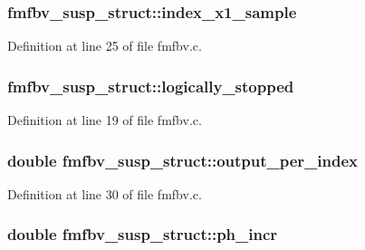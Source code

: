 \subsubsection[{\texorpdfstring{index\+\_\+x1\+\_\+sample}{index_x1_sample}}]{ fmfbv\+\_\+susp\+\_\+struct\+::index\+\_\+x1\+\_\+sample}\hypertarget{structfmfbv__susp__struct_a6970c3b7b1824fd09514ded85c92fd02}{}\label{structfmfbv__susp__struct_a6970c3b7b1824fd09514ded85c92fd02}


Definition at line 25 of file fmfbv.\+c.

\subsubsection[{\texorpdfstring{logically\+\_\+stopped}{logically_stopped}}]{ fmfbv\+\_\+susp\+\_\+struct\+::logically\+\_\+stopped}\hypertarget{structfmfbv__susp__struct_a9307bf1cf670bf7fa11a7f42f674cdbf}{}\label{structfmfbv__susp__struct_a9307bf1cf670bf7fa11a7f42f674cdbf}


Definition at line 19 of file fmfbv.\+c.

\subsubsection[{\texorpdfstring{output\+\_\+per\+\_\+index}{output_per_index}}]{\setlength{\rightskip}{0pt plus 5cm}double fmfbv\+\_\+susp\+\_\+struct\+::output\+\_\+per\+\_\+index}\hypertarget{structfmfbv__susp__struct_a3798c00c3248a599b9cf341f925e6239}{}\label{structfmfbv__susp__struct_a3798c00c3248a599b9cf341f925e6239}


Definition at line 30 of file fmfbv.\+c.

\subsubsection[{\texorpdfstring{ph\+\_\+incr}{ph_incr}}]{\setlength{\rightskip}{0pt plus 5cm}double fmfbv\+\_\+susp\+\_\+struct\+::ph\+\_\+incr}\hypertarget{structfmfbv__susp__struct_ad8731c667c9968e918f24388f01364dc}{}\label{structfmfbv__susp__struct_ad8731c667c9968e918f24388f01364dc}


